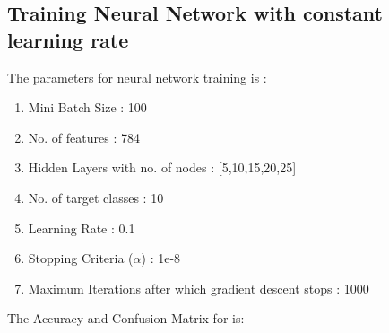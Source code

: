 \documentclass[11pt]{article}
\begin{document}
\subsection{Training Neural Network with constant learning rate}
The parameters for neural network training is :
\begin{enumerate}
\item Mini Batch Size : 100
\item No. of features : 784
\item Hidden Layers with no. of nodes : [5,10,15,20,25]
\item No. of target classes : 10
\item Learning Rate : 0.1
\item Stopping Criteria ($\alpha$) : 1e-8
\item Maximum Iterations after which gradient descent stops : 1000
\end{enumerate}
The Accuracy and Confusion Matrix for is:
\vspace{3mm}
\hline
\end{document}
